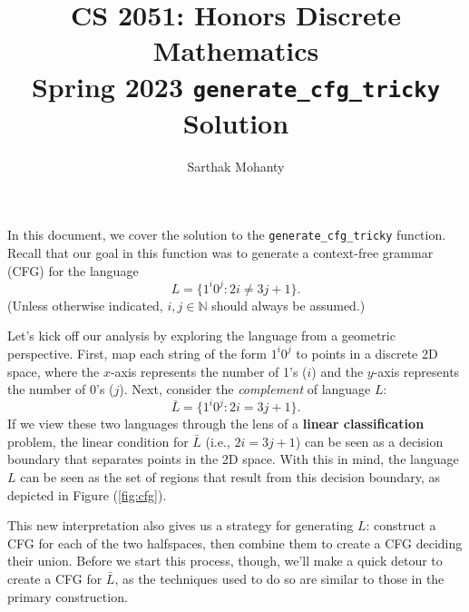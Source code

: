 \documentclass{article}
\title{\vspace{-1cm}CS 2051: Honors Discrete Mathematics \\Spring 2023 \texttt{generate\_cfg\_tricky} Solution}
\author{Sarthak Mohanty}
\date{}
\begin{document}
\maketitle

In this document, we cover the solution to the \lstinline{generate_cfg_tricky} function. Recall that our goal in this function was to generate a context-free grammar (CFG) for the language $$L = \{1^{i}0^{j} : 2i \ne 3j + 1\}.$$ (Unless otherwise indicated, $i, j \in \mathbb{N}$ should always be assumed.)

\vspace{2mm}Let's kick off our analysis by exploring the language from a geometric perspective. First, map each string of the form $1^{i}0^{j}$ to points in a discrete 2D space, where the $x$-axis represents the number of 1's ($i$) and the $y$-axis represents the number of 0's ($j$). Next, consider the \textit{complement} of language $L$: $$\bar{L} = \{1^{i}0^{j} : 2i = 3j + 1\}.$$ If we view these two languages through the lens of a \textbf{linear classification} problem, the linear condition for $\bar{L}$ (i.e., $2i = 3j + 1$) can be seen as a decision boundary that separates points in the 2D space. With this in mind, the language $L$ can be seen as the set of regions that result from this decision boundary, as depicted in Figure (\ref{fig:cfg}).

\vspace{2mm}
This new interpretation also gives us a strategy for generating $L$: construct a CFG for each of the two halfspaces, then combine them to create a CFG deciding their union. Before we start this process, though, we'll make a quick detour to create a CFG for $\bar{L}$, as the techniques used to do so are similar to those in the primary construction.
\end{document}
